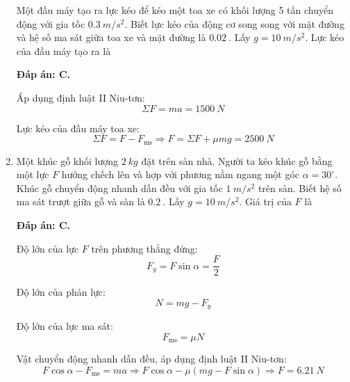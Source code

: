 \begin{enumerate}[label=\bfseries Câu \arabic*:]
	
	{Một đầu máy tạo ra lực kéo để kéo một toa xe có khối lượng 5 tấn chuyển động với gia tốc $\SI{0.3}{m/s^2}$. Biết lực kéo của động cơ song song với mặt đường và hệ số ma sát giữa toa xe và mặt đường là $\SI{0.02}{}$. Lấy $g=\SI{10}{m/s^2}$. Lực kéo của đầu máy tạo ra là
	}
	
	\hideall
	{	\textbf{Đáp án: C.}	
		
		Áp dụng định luật II Niu-tơn:
		$$\Sigma F = ma = \SI{1500}{N}$$
		
		Lực kéo của đầu máy toa xe:
		$$\Sigma F= F-F_\text{ms} \Rightarrow F = \Sigma F + \mu mg = \SI{2500}{N}$$
	}
	\item {}
	
	
	{Một khúc gỗ khối lượng $\SI{2}{kg}$ đặt trên sàn nhà. Người ta kéo khúc gỗ bằng một lực $F$ hướng chếch lên và hợp với phương nằm ngang một góc $\alpha=30^\circ$. Khúc gỗ chuyển động nhanh dần đều với gia tốc $\SI{1}{m/s^2}$ trên sàn. Biết hệ số ma sát trượt giữa gỗ và sàn là $\SI{0.2}{}$. Lấy $g=\SI{10}{m/s^2}$. Giá trị của $F$ là
	}
	
	\hideall
	{	\textbf{Đáp án: C.}
		
		Độ lớn của lực $F$ trên phương thẳng đứng:
		$$F_y = F \sin \alpha = \dfrac{F}{2}$$
		
		Độ lớn của phản lực:
		$$N=mg-F_y $$
		
		Độ lớn của lực ma sát:
		$$F_\text{ms} = \mu N$$
		
		Vật chuyển động nhanh dần đều, áp dụng định luật II Niu-tơn:
		$$F \cos \alpha - F_\text{ms} = ma \Rightarrow F \cos \alpha - \mu (mg - F \sin \alpha) \Rightarrow F = \SI{6.21}{N} $$
		
	}
	
	
\end{enumerate}



